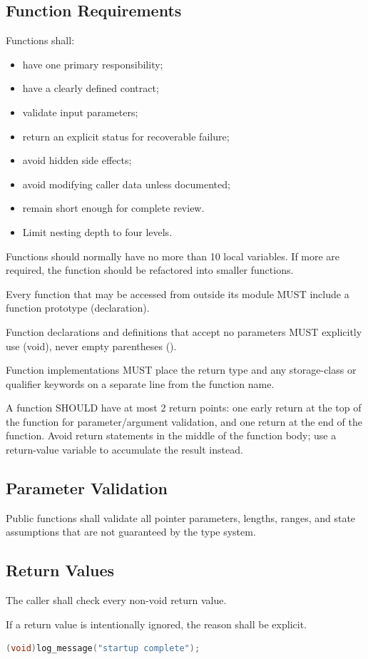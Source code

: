 \subsection{Function Requirements}

Functions shall:

\begin{itemize}
	\item have one primary responsibility;
	\item have a clearly defined contract;
	\item validate input parameters;
	\item return an explicit status for recoverable failure;
	\item avoid hidden side effects;
	\item avoid modifying caller data unless documented;
	\item remain short enough for complete review.
	\item Limit nesting depth to four levels.
\end{itemize}

Functions should normally have no more than 10 local variables. If more are required, the function should be refactored into smaller functions.

Every function that may be accessed from outside its module MUST include a function prototype (declaration).

Function declarations and definitions that accept no parameters MUST explicitly use (void), never empty parentheses ().

Function implementations MUST place the return type and any storage-class or qualifier keywords on a separate line from the function name.

A function SHOULD have at most 2 return points: one early return at the top of the function for parameter/argument validation, and one return at the end of the function. Avoid return statements in the middle of the function body; use a return-value variable to accumulate the result instead.



\subsection{Parameter Validation}

Public functions shall validate all pointer parameters, lengths, ranges, and state assumptions that are not guaranteed by the type system.

\subsection{Return Values}

The caller shall check every non-void return value.

If a return value is intentionally ignored, the reason shall be explicit.

\begin{lstlisting}[language=C]
(void)log_message("startup complete");
\end{lstlisting}
